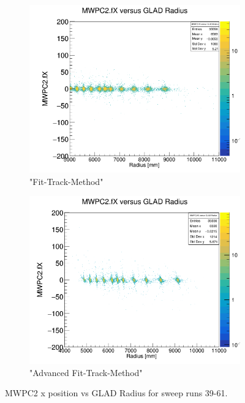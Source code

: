 \documentclass[12pt, letterpaper]{article}
\begin{document}
\begin{figure}[!htbp]
\begin{subfigure}{.5\textwidth}
\end{subfigure}
\begin{subfigure}{.5\textwidth}
  \centering
  \includegraphics[width=.9\linewidth]{plot_imgs/mw2_rho_fit.png} 
  \caption{"Fit-Track-Method"}
  \label{fig:sub-second}
\end{subfigure}
\begin{subfigure}{.5\textwidth}
  \centering
  \includegraphics[width=.9\linewidth]{plot_imgs/mw2_rho_last.png} 
  \caption{"Advanced Fit-Track-Method"}
  \label{fig:sub-second}
\end{subfigure}
\caption{MWPC2 x position vs GLAD Radius for sweep runs 39-61.}
\label{fig:fig}
\end{figure}
\FloatBarrier
\clearpage
\end{document}
